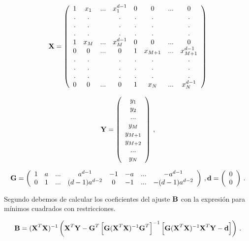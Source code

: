 \documentclass[
]{agujournal2019}
\begin{document}
\[ {\textbf X}=\left(\begin{array}{cccccccc}
  1 & x_1   & .  .  . & x_1^{d-1}  & 0 & 0 & .  .  . & 0 \\
  . & .         &  & .                  & . & . &  & . \\
  . & .         &  & .                  & . & . &  & . \\
  . & .         &  & .                  & . & . &  & . \\
  1 & x_M & .  .  . & x_M^{d-1} & 0 & 0 & .  .  . & 0 \\
  0 & 0       & .  .  . & 0                 & 1 & x_{M+1} & .  .  . & x^{d-1}_{M+1} \\
  . & .         && .                  & . & . &  & . \\
  . & .         & & .                  & . & . &  & . \\
  . & .         &  & .                  & . & . &  & . \\
  0 & 0       & .  .  . & 0                & 1  & x_N & .  .  . & x_N^{d-1} \\
  \end{array}\right)
  \]

\[{\textbf Y}=\left(\begin{array}{c}
    y_1 \\ y_2 \\ . . . \\ y_M \\ y_{M+1}\\ y_{M+2}\\...\\y_N
      \end{array}\right)\,,\]

\[{\textbf G}=\left(\begin{array}{cccccccc}
        1 & a & .  .  .&a^{d-1}&-1&-a& .  .  .&-a^{d-1}\\
        0 & 1 & .  .  .&(d-1)a^{d-2}&0&-1& .  .  .&-(d-1)a^{d-2}\\
          \end{array}\right)\,,
          {\textbf d}=\left(\begin{array}{c}
            0\\
            0\\
              \end{array}\right)\,.\]

Segundo debemos de calcular los coeficientes del ajuste \({\textbf B}\)
con la expresión para mínimos cuadrados con restricciones.

\[{\textbf B}=({\textbf X}^T {\textbf X})^{-1}\left( {\textbf X}^T {\textbf Y} - {\textbf G}^T\left[{\textbf G}({\textbf X}^T{\textbf X})^{-1}{\textbf G}^T \right]^{-1}
           \left[{\textbf G}({\textbf X}^T{\textbf X})^{-1}{\textbf X}^T {\textbf Y}-{\textbf d}\right] \right)\,.\]
\end{document}
